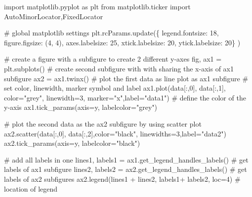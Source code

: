 \documentclass[
  letterpaper,
  DIV=11,
  numbers=noendperiod]{scrreprt}
\newenvironment{Shaded}{\begin{snugshade}}{\end{snugshade}}
\newcommand{\CommentTok}[1]{\textcolor[rgb]{0.37,0.37,0.37}{#1}}
\newcommand{\DecValTok}[1]{\textcolor[rgb]{0.68,0.00,0.00}{#1}}
\newcommand{\ImportTok}[1]{\textcolor[rgb]{0.00,0.46,0.62}{#1}}
\newcommand{\NormalTok}[1]{\textcolor[rgb]{0.00,0.23,0.31}{#1}}
\newcommand{\OperatorTok}[1]{\textcolor[rgb]{0.37,0.37,0.37}{#1}}
\newcommand{\StringTok}[1]{\textcolor[rgb]{0.13,0.47,0.30}{#1}}
\begin{document}
\begin{Shaded}
\begin{Highlighting}[]
\ImportTok{import}\NormalTok{ matplotlib.pyplot }\ImportTok{as}\NormalTok{ plt}
\ImportTok{from}\NormalTok{ matplotlib.ticker }\ImportTok{import}\NormalTok{ AutoMinorLocator,FixedLocator}


\CommentTok{\# global matplotlib settings}
\NormalTok{plt.rcParams.update(\{}
    \StringTok{\textquotesingle{}legend.fontsize\textquotesingle{}}\NormalTok{: }\DecValTok{18}\NormalTok{,}
    \StringTok{\textquotesingle{}figure.figsize\textquotesingle{}}\NormalTok{: (}\DecValTok{4}\NormalTok{, }\DecValTok{4}\NormalTok{),}
    \StringTok{\textquotesingle{}axes.labelsize\textquotesingle{}}\NormalTok{: }\DecValTok{25}\NormalTok{,}
    \StringTok{\textquotesingle{}xtick.labelsize\textquotesingle{}}\NormalTok{: }\DecValTok{20}\NormalTok{,}
    \StringTok{\textquotesingle{}ytick.labelsize\textquotesingle{}}\NormalTok{: }\DecValTok{20}\NormalTok{\}}
\NormalTok{)}

\CommentTok{\# create a figure with a subfigure to create 2 different y{-}axes}
\NormalTok{fig, ax1 }\OperatorTok{=}\NormalTok{ plt.subplots()}
\CommentTok{\# create second subfigure with with sharing the x{-}axis of ax1 subfigure}
\NormalTok{ax2 }\OperatorTok{=}\NormalTok{ ax1.twinx() }
\CommentTok{\# plot the first data as line plot as ax1 subfigure}
\CommentTok{\# set color, linewidth, marker symbol and label}
\NormalTok{ax1.plot(data[:,}\DecValTok{0}\NormalTok{], data[:,}\DecValTok{1}\NormalTok{], color}\OperatorTok{=}\StringTok{"grey"}\NormalTok{, linewidth}\OperatorTok{=}\DecValTok{3}\NormalTok{, marker}\OperatorTok{=}\StringTok{"x"}\NormalTok{,label}\OperatorTok{=}\StringTok{"data1"}\NormalTok{)}
\CommentTok{\# define the color of the y{-}axis}
\NormalTok{ax1.tick\_params(axis}\OperatorTok{=}\StringTok{\textquotesingle{}y\textquotesingle{}}\NormalTok{, labelcolor}\OperatorTok{=}\StringTok{"grey"}\NormalTok{)}

\CommentTok{\# plot the second data as the ax2 subfigure by using scatter plot}
\NormalTok{ax2.scatter(data[:,}\DecValTok{0}\NormalTok{], data[:,}\DecValTok{2}\NormalTok{],color}\OperatorTok{=}\StringTok{"black"}\NormalTok{, linewidths}\OperatorTok{=}\DecValTok{3}\NormalTok{,label}\OperatorTok{=}\StringTok{"data2"}\NormalTok{)}
\NormalTok{ax2.tick\_params(axis}\OperatorTok{=}\StringTok{\textquotesingle{}y\textquotesingle{}}\NormalTok{, labelcolor}\OperatorTok{=}\StringTok{"black"}\NormalTok{)}

\CommentTok{\# add all labels in one }
\NormalTok{lines1, labels1 }\OperatorTok{=}\NormalTok{ ax1.get\_legend\_handles\_labels() }\CommentTok{\# get labels of ax1 subfigure}
\NormalTok{lines2, labels2 }\OperatorTok{=}\NormalTok{ ax2.get\_legend\_handles\_labels() }\CommentTok{\# get labels of ax2 subfigures}
\NormalTok{ax2.legend(lines1 }\OperatorTok{+}\NormalTok{ lines2, labels1}\OperatorTok{+}\NormalTok{ labels2, loc}\OperatorTok{=}\DecValTok{4}\NormalTok{) }\CommentTok{\# location of legend}


\end{Highlighting}
\end{Shaded}
\end{document}
